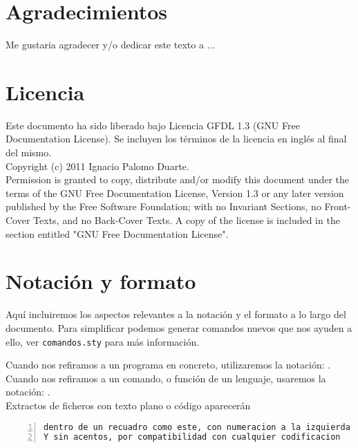 

\section*{Agradecimientos}

Me gustaria agradecer y/o dedicar este texto a ...

\cleardoublepage

\section*{Licencia} %

Este documento ha sido liberado bajo Licencia GFDL 1.3 (GNU Free
Documentation License). Se incluyen los términos de la licencia en
inglés al final del mismo.\\

Copyright (c) 2011 Ignacio Palomo Duarte.\\

Permission is granted to copy, distribute and/or modify this document under the
terms of the GNU Free Documentation License, Version 1.3 or any later version
published by the Free Software Foundation; with no Invariant Sections, no
Front-Cover Texts, and no Back-Cover Texts. A copy of the license is included in
the section entitled "GNU Free Documentation License".\\

\cleardoublepage

\section*{Notación y formato}

Aquí incluiremos los aspectos relevantes a la notación y el formato a
lo largo del documento. Para simplificar podemos generar comandos
nuevos que nos ayuden a ello, ver \texttt{comandos.sty} para más
información. 

Cuando nos refiramos a un programa en concreto, utilizaremos la
notación: .\\

Cuando nos refiramos a un comando, o función de un lenguaje, usaremos
la notación: .\\

Extractos de ficheros con texto plano o código aparecerán

\begin{lstlisting}[caption={[]Ejemplo de listado}, numbers=left]
dentro de un recuadro como este, con numeracion a la izquierda
Y sin acentos, por compatibilidad con cualquier codificacion
\end{lstlisting}
